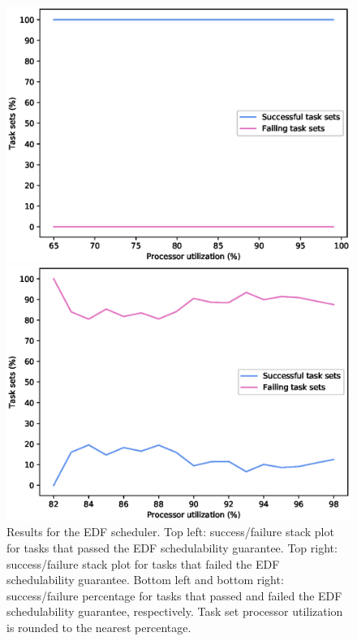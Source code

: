 \begin{figure}[htpb]
\begin{minipage}{0.62\textwidth}
    \end{minipage}
    \hspace*{-1.6cm}
    \begin{minipage}{0.62\textwidth}
        \includegraphics[width=\textwidth]{figures/crossover_edf_succ.eps}
    \end{minipage}%
    \begin{minipage}{0.62\textwidth}
        \includegraphics[width=\textwidth]{figures/crossover_edf_fail.eps}
    \end{minipage}
    \caption{Results for the EDF scheduler. Top left: success/failure stack plot for tasks that passed the EDF schedulability guarantee. Top right: success/failure stack plot for tasks that failed the EDF schedulability guarantee. Bottom left and bottom right: success/failure percentage for tasks that passed and failed the EDF schedulability guarantee, respectively. Task set processor utilization is rounded to the nearest percentage.}
    \label{fig:edfresults}
\end{figure}

